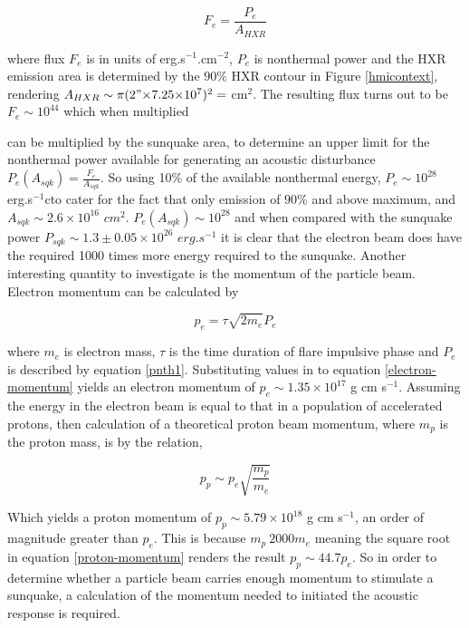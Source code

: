 \documentclass[11pt]{article}
\begin{document}
\begin{equation}\label{electronflux}
F_e = \frac{P_{e}}{A_{HXR}}
\end{equation}

where flux $F_e$ is in units of erg.s$^{-1}$.cm$^{-2}$, $P_e$ is nonthermal power and the HXR emission area is determined by the $90\%$ HXR contour in Figure \ref{hmicontext}, rendering $A_{HXR} \sim \pi (2"{\times}7.25{\times}10^{7})^{2} = $ cm$^{2}$. The resulting flux turns out to be $F_e \sim 10^{44}$ which when multiplied

can be multiplied by the sunquake area, to determine an upper limit for the nonthermal power available for generating an acoustic disturbance $P_{e}(A_{sqk}) = \frac{F_e}{A_{sqk}}$. So using 10\% of the available nonthermal energy, $P_e \sim 10^{28}$ erg.s$^{-1}$cto cater for the fact that only emission of $90\%$ and above maximum, and $A_{sqk} \sim 2.6{\times}10^{16}$ $cm^{2}$. $P_{e}(A_{sqk}) \sim 10^{28}$ and when compared with the sunquake power $P_{sqk} \sim 1.3\pm0.05{\times}10^{26}$ $erg.s^{-1}$ it is clear that the electron beam does have the required 1000 times more energy required to the sunquake. Another interesting quantity to investigate is the momentum of the particle beam. Electron momentum can be calculated by 


\begin{equation}\label{electron-momentum}
p_e=\tau \sqrt{2m_e} P_{e}
\end{equation}

where $m_e$ is electron mass, $\tau$ is the time duration of flare impulsive phase and $P_{e}$ is described by equation \ref{pnth1}. Substituting values in to equation \ref{electron-momentum} yields an electron momentum of $p_e \sim 1.35{\times}10^{17}$ g cm s$^{-1}$. Assuming the energy in the electron beam is equal to that in a population of accelerated protons, then calculation of a theoretical proton beam momentum, where $m_p$ is the proton mass, is by the relation,

\begin{equation}\label{proton-momentum}
p_p \sim p_e \sqrt{\frac{m_p}{m_e}}
\end{equation}

Which yields a proton momentum of $p_p \sim 5.79{\times}10^18$ g cm s$^{-1}$, an order of magnitude greater than $p_e$. This is because $m_p ~ 2000m_e$ meaning the square root in equation \ref{proton-momentum} renders the result $p_p \sim 44.7p_e$. So in order to determine whether a particle beam carries enough momentum to stimulate a sunquake, a calculation of the momentum needed to initiated the acoustic response is required.\\
\end{document}
